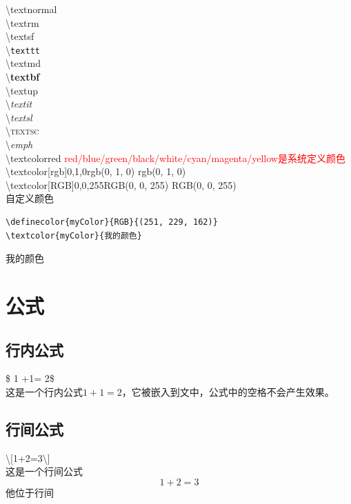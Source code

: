 \documentclass{article}
\begin{document}
	\large 
	
	\noindent\textbackslash\textnormal{textnormal}\\
	\textbackslash\textrm{textrm}\\
	\textbackslash\textsf{textsf}\\
	\textbackslash\texttt{texttt}\\
	\textbackslash\textmd{textmd}\\
	\textbackslash\textbf{textbf}\\
	\textbackslash\textup{textup}\\
	\textbackslash\textit{textit}\\
	\textbackslash\textsl{textsl}\\
	\textbackslash\textsc{textsc}\\
	\textbackslash\emph{emph}\\
	
	
	\textbackslash textcolor{red}
	\noindent\textcolor{red}{red/blue/green/black/white/cyan/magenta/yellow是系统定义颜色}\\
	\textbackslash textcolor[rgb]{0,1,0}{rgb(0, 1, 0)}
	\textcolor[rgb]{0,1,0}{rgb(0, 1, 0)}\\
	\textbackslash textcolor[RGB]{0,0,255}{RGB(0, 0, 255)}
	\textcolor[RGB]{0,0,255}{RGB(0, 0, 255)}\\
	
	\noindent 自定义颜色\\
	\begin{lstlisting}
\definecolor{myColor}{RGB}{(251, 229, 162)}
\textcolor{myColor}{我的颜色}
	\end{lstlisting}

	\textcolor{myColor}{我的颜色}

	
	\section{公式}
	\subsection{行内公式}
	\normalsize
	\noindent\$ 1 +1=    2\$\\
	这是一个行内公式$ 1 +1 =    2 $，它被嵌入到文中，公式中的空格不会产生效果。
	
	
	\subsection{行间公式}
	\noindent\textbackslash[1+2=3\textbackslash]\\
	这是一个行间公式
	\[1+2=3\]他位于行间
	
\end{document}
